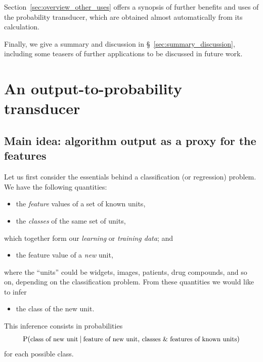 \documentclass[a4paper,12pt,%
onecolumn,oneside,article,%
british%
]{memoir}
\newcommand*{\amp}{\&}
\newcommand*{\pencil}{{\fontencoding{U}\fontfamily{fontawesometwo}\selectfont\symbol{210}}}
\newcommand{\mynotep}[1]{{\footnotesize\color{notecolour}\pencil\ #1}}
\renewcommand*{\P}{\mathrm{P}}%
\renewcommand*{\|}[1][]{\nonscript\:#1\vert\nonscript\:\mathopen{}}
\newcommand*{\sect}{\S}%
\newcommand*{\texts}[1]{\text{\small #1}}
\begin{document}
Section~\ref{sec:overview_other_uses} offers a synopsis of further benefits and uses of the probability transducer, which are obtained almost automatically from its calculation.

Finally, we give a summary and discussion in \sect~\ref{sec:summary_discussion}, including some teasers of further applications to be discussed in future work.


\section{An output-to-probability transducer}
\label{sec:transducer}




\subsection{Main idea: algorithm output as a proxy for the features}
\label{sec:essential_idea}

Let us first consider the essentials behind a classification (or regression) problem. We have the following quantities:
\begin{itemize}
\item the \emph{feature} values of a set of known units,
\item the \emph{classes} of the same set of units,
\end{itemize}
which together form our \emph{learning} or \emph{training data}; and
\begin{itemize}[resume]
\item the feature value of a \emph{new} unit,
\end{itemize}
where the \enquote{units} could be widgets, images, patients, drug compounds, and so on, depending on the classification problem. From these quantities we would like to infer
\begin{itemize}[resume]
\item  the class of the new unit.
\end{itemize}
This inference consists in probabilities
\begin{equation}
  \label{eq:prob_essential}
  \P(\texts{class of new unit} \| \texts{feature of new unit},\,
  \texts{classes \amp\ features of known units})
\end{equation}
for each possible class.
\end{document}
